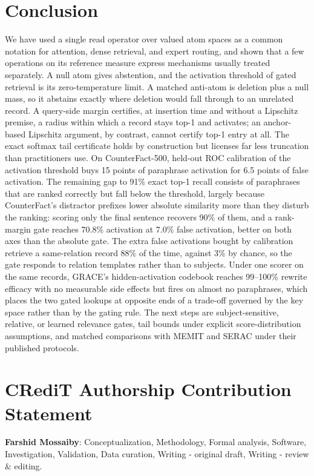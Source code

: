 \documentclass[preprint,12pt]{elsarticle}
\newif\ifmarkchanges
\newcommand{\rev}[1]{\ifmarkchanges{\color{blue}#1}\else#1\fi}
\begin{document}
\section{Conclusion}
\label{sec:conclusion}

We have used a single read operator over valued atom spaces as a common notation for attention, dense retrieval, and expert routing, \rev{and shown that a few operations on its reference measure express mechanisms usually treated separately. A null atom gives abstention, and the activation threshold of gated retrieval is its zero-temperature limit. A matched anti-atom is deletion plus a null mass, so it abstains exactly where deletion would fall through to an unrelated record. A query-side margin certifies, at insertion time and without a Lipschitz premise, a radius within which a record stays top-1 and activates; an anchor-based Lipschitz argument, by contrast, cannot certify top-1 entry at all.} The exact softmax tail certificate holds by construction but licenses far less truncation than practitioners use. On CounterFact-500, held-out ROC calibration of the activation threshold buys 15 points of paraphrase activation for 6.5 points of false activation. \rev{The remaining gap to 91\% exact top-1 recall consists of paraphrases that are ranked correctly but fall below the threshold, largely because CounterFact's distractor prefixes lower absolute similarity more than they disturb the ranking: scoring only the final sentence recovers 90\% of them, and a rank-margin gate reaches 70.8\% activation at 7.0\% false activation, better on both axes than the absolute gate. The extra false activations bought by calibration retrieve a same-relation record 88\% of the time, against 3\% by chance, so the gate responds to relation templates rather than to subjects.} Under one scorer on the same records, GRACE's hidden-activation codebook reaches 99--100\% rewrite efficacy with no measurable side effects but fires on almost no paraphrases, which places the two gated lookups at opposite ends of a trade-off governed by the key space rather than by the gating rule. The next steps are subject-sensitive, relative, or learned relevance gates, tail bounds under explicit score-distribution assumptions, and matched comparisons with MEMIT and SERAC under their published protocols.

\section*{CRediT Authorship Contribution Statement}
\textbf{Farshid Mossaiby}: Conceptualization, Methodology, Formal analysis, Software, Investigation, Validation, Data curation, Writing - original draft, Writing - review \& editing.
\end{document}
